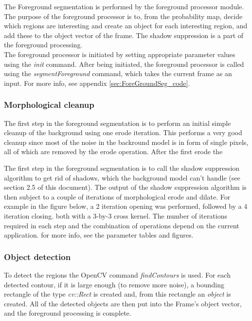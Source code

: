 The Foreground segmentation is performed by the foreground processor module. The purpose of the foreground processor is to, from the probability map, decide which regions are interesting and create an object for each interesting region, and add these to the object vector of the frame. The shadow suppression is a part of the foreground processing. \\
\newline
The foreground processor is initiated by setting appropriate parameter values using the \emph{init} command. After being initiated, the foreground processor is called using the \emph{segmentForeground} command, which takes the current frame as an input. For more info, see appendix \ref{sec:ForeGroundSeg_code}.

\subsubsection{Morphological cleanup}
The first step in the foreground segmentation is to perform an initial simple cleanup of the background using one erode iteration. This performs a very good cleanup since most of the noise in the backround model is in form of single pixels, all of which are removed by the erode operation. After the first erode the 

The first step in the foreground segmentation is to call the shadow suppression algorithm to get rid of shadows, which the background model can't handle (see section 2.5 of this document). The output of the shadow suppression algorithm is then subject to a couple of iterations of morphological erode and dilate. For example in the figure below, a 2 iteration opening was performed, followed by a 4 iteration closing. both with a 3-by-3 cross kernel. The number of iterations required in each step and the combination of operations depend on the current application. for more info, see the parameter tables and figures.


\subsubsection{Object detection}
To detect the regions the OpenCV command \emph{findContours} is used. For each detected contour, if it is large enough (to remove more noise), a bounding rectangle of the type \emph{cv::Rect} is created and, from this rectangle an \emph{object} is created. All of the detected objects are then put into the Frame's object vector, and the foreground processing is complete.